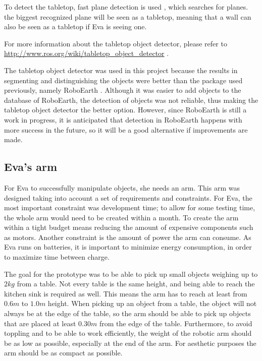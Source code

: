 \documentclass[project_eva.tex]{subfiles}
\begin{document}
To detect the tabletop, fast plane detection is used \cite{plane}, which 
searches for planes. the biggest recognized plane will be seen as a tabletop, meaning that a wall can also be seen as a 
tabletop if Eva is seeing one.

For more information about the tabletop object detector, please refer to \url{http://www.ros.org/wiki/tabletop\_object\_detector} \cite{tabletop}.

The tabletop object detector was used in this project because the results in segmenting and distinguishing the objects were 
better than the package used previously, namely RoboEarth \cite{Roboearth}. Although it was easier to add objects to the 
database of RoboEarth, the detection of objects was not reliable, thus making the tabletop object detector the better 
option. However, since RoboEarth is still a work in progress, it is anticipated that detection in RoboEarth happens with 
more success in the future, so it will be a good alternative if improvements are made.

\subsection*{Eva's arm}
For Eva to successfully manipulate objects, she needs an arm. This arm was designed taking into account a set of requirements and constraints. For Eva, the most important constraint was development time; to allow for some testing time, the whole arm would need to be created within a month. To create the arm within a tight budget means reducing the amount of expensive components such as motors. Another constraint is the amount of power the arm can consume. As Eva runs on batteries, it is important to minimize energy consumption, in order to maximize time between charge.

 The goal for the prototype was to be able to pick up small objects weighing up to $2kg$ from a table. Not every table is the same height, and being able to reach the kitchen sink is required as well. This means the arm has to reach at least from $0.6m$ to $1.0m$ height. %
When picking up an object from a table, the object will not always be at the edge of the table, so the arm should be able to pick up objects that are placed at least $0.30m$ from the edge of the table. %
Furthermore, to avoid toppling and to be able to work efficiently, the weight of the robotic arm should be as low as possible, especially at the end of the arm. For aesthetic purposes the arm should be as compact as possible.
\end{document}
